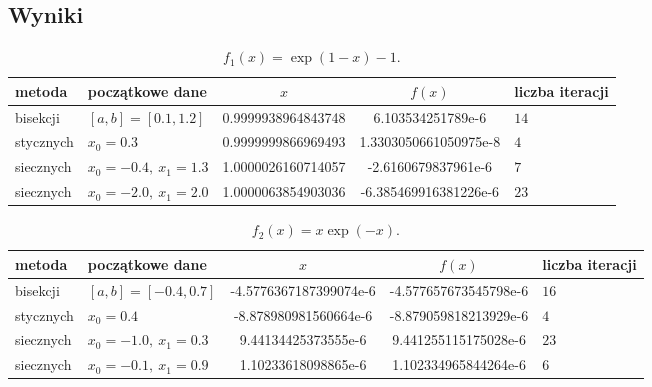 \documentclass{classrep}
\begin{document}
		
	\subsection{Wyniki}
		\begin{table}[!hpbt]
        		\centering
        		\footnotesize
			\begin{tabular}{llSSl} \toprule
				{metoda} & {początkowe dane} &{$x$} & {$f(x)$} & {liczba iteracji}\\ \midrule
				bisekcji & $[a,b]=[0.1,1.2]$ & 0.9999938964843748 & 6.103534251789e-6 & $14$ \\ 
	 			stycznych & $x_0=0.3$ & 0.9999999866969493 & 1.3303050661050975e-8 & $4$ \\
	 			siecznych & $x_0=-0.4,~x_1=1.3$ & 1.0000026160714057 & -2.6160679837961e-6 & $7$ \\ 
	 			siecznych & $x_0=-2.0,~x_1=2.0$ & 1.0000063854903036 & -6.385469916381226e-6 & $23$ \\ \bottomrule
	 		\end{tabular}
	 		\caption{$f_1(x)=\exp(1-x)-1$.}
			\label{table:3}
		\end{table}
			
		\begin{table}[!hpbt]
        		\centering
        		\footnotesize
			\begin{tabular}{llSSl} \toprule
				{metoda} & {początkowe dane} &{$x$} & {$f(x)$} & {liczba iteracji}\\ \midrule
				bisekcji & $[a,b]=[-0.4,0.7]$ & -4.5776367187399074e-6 & -4.577657673545798e-6 & $16$ \\ 
	 			stycznych & $x_0=0.4$ & -8.878980981560664e-6 & -8.879059818213929e-6 & $4$ \\  	
	 			siecznych & $x_0=-1.0,~x_1=0.3$ & 9.44134425373555e-6 & 9.441255115175028e-6 & $23$ \\
	 			siecznych & $x_0=-0.1,~x_1=0.9$ & 1.10233618098865e-6 & 1.102334965844264e-6 & $6$ \\ \bottomrule
	 		\end{tabular}
	 		\caption{$f_2(x)=x\exp(-x)$.}
			\label{table:4}			
		\end{table}	
		
\end{document}
